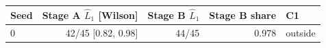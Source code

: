 \begin{tabular}{lrrrl}
\toprule
Seed & Stage A $\hat L_1$ [Wilson] & Stage B $\hat L_1$ & Stage B share & C1 \\
\midrule
0 & 42/45 [0.82, 0.98] & 44/45 & 0.978 & outside \\
\bottomrule
\end{tabular}
